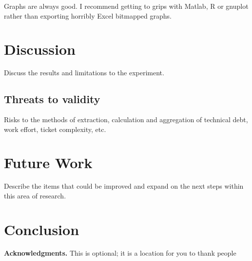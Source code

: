 \documentclass{mpaper}
\begin{document}
Graphs are always good. I recommend getting to grips with Matlab, R or
gnuplot rather than exporting horribly Excel bitmapped graphs.

\section{Discussion}
\label{discussion}

Discuss the results and limitations to the experiment.

\subsection{Threats to validity}
\label{validity}

Risks to the methods of extraction, calculation and aggregation of technical
debt, work effort, ticket complexity, etc.


\section{Future Work}
\label{future-work}

Describe the items that could be improved and expand on the next steps within
this area of research.

\section{Conclusion}
\label{conclusion}

{\bf Acknowledgments.}
This is optional; it is a location for you to thank people



\end{document}
